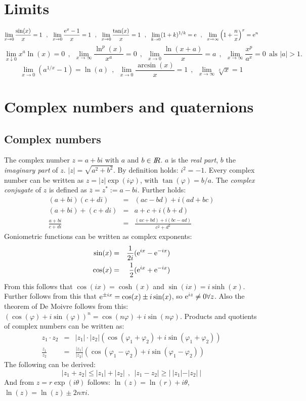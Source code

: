 \documentclass[twoside]{report}
\begin{document}
\section{Limits}
\[
\lim_{x\rightarrow0}\frac{\sin(x)}{x}=1~~,~~
\lim_{x\rightarrow0}\frac{{\rm e}^x-1}{x}=1~~,~~
\lim_{x\rightarrow0}\frac{\tan(x)}{x}=1~~,~~
\lim_{k\rightarrow0}(1+k)^{1/k}={\rm e}~~,~~
\lim_{x\rightarrow\infty}\left(1+\frac{n}{x}\right)^x={\rm e}^n
\]
\[
\lim_{x\downarrow0}x^a\ln(x)=0~~,~~
\lim_{x\rightarrow\infty}\frac{\ln^p(x)}{x^a}=0~~,~~
\lim_{x\rightarrow0}\frac{\ln(x+a)}{x}=a~~,~~
\lim_{x\rightarrow\infty}\frac{x^p}{a^x}=0~~\mbox{als }|a|>1.
\]
\[
\lim_{x\rightarrow0}\left(a^{1/x}-1\right)=\ln(a)~~,~~
\lim_{x\rightarrow0}\frac{\arcsin(x)}{x}=1~~,~~
\lim_{x\rightarrow\infty}\sqrt[x]{x}=1
\]

\section{Complex numbers and quaternions}
\subsection{Complex numbers}
The complex number $z=a+bi$ with $a$ and $b\in I\hspace{-1mm}R$. $a$ is the {\it real part},
$b$ the {\it imaginary part} of $z$. $|z|=\sqrt{a^2+b^2}$. By definition
holds: $i^2=-1$. Every complex number can be written as $z=|z|\exp(i\varphi)$,
with $\tan(\varphi)=b/a$. The {\it complex conjugate} of $z$ is defined as
$\overline{z}=z^*:=a-bi$. Further holds:
\begin{eqnarray*}
(a+bi)(c+di)&=&(ac-bd)+i(ad+bc)\\
(a+bi)+(c+di)&=&a+c+i(b+d)\\
\frac{a+bi}{c+di}&=&\frac{(ac+bd)+i(bc-ad)}{c^2+d^2}
\end{eqnarray*}
Goniometric functions can be written as complex exponents:
\begin{eqnarray*}
\sin(x)&=&\frac{1}{2i}({\rm e}^{ix}-{\rm e}^{-ix})\\
\cos(x)&=&\frac{1}{2}({\rm e}^{ix}+{\rm e}^{-ix})
\end{eqnarray*}
From this follows that $\cos(ix)=\cosh(x)$ and $\sin(ix)=i\sinh(x)$.
Further follows from this that\newline
${\rm e}^{\pm ix}=\cos(x)\pm i\sin(x)$, so
${\rm e}^{iz}\neq0\forall z$. Also the theorem of De Moivre follows from
this:\\ $(\cos(\varphi)+i\sin(\varphi))^n=\cos(n\varphi)+i\sin(n\varphi)$.
\npar
Products and quotients of complex numbers can be written as:
\begin{eqnarray*}
z_1\cdot z_2&=&|z_1|\cdot|z_2|(\cos(\varphi_1+\varphi_2)+i\sin(\varphi_1+\varphi_2))\\
\frac{z_1}{z_2}&=&\frac{|z_1|}{|z_2|}(\cos(\varphi_1-\varphi_2)+i\sin(\varphi_1-\varphi_2))
\end{eqnarray*}
The following can be derived:
\[
|z_1+z_2|\leq|z_1|+|z_2|~~,~~|z_1-z_2|\geq|~|z_1|-|z_2|~|
\]
And from $z=r\exp(i\theta)$ follows: $\ln(z)=\ln(r)+i\theta$, $\ln(z)=\ln(z)\pm2n\pi i$.
\end{document}
